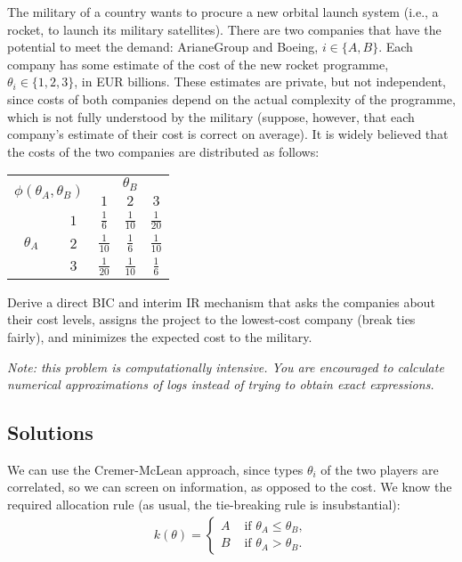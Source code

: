 \documentclass[a4paper]{article}
\newif\ifsolutions
\begin{document}
The military of a country wants to procure a new orbital launch system (i.e., a rocket, to launch its military satellites). There are two companies that have the potential to meet the demand: ArianeGroup and Boeing, $i \in \{A,B\}$. Each company has some estimate of the cost of the new rocket programme, $\theta_i \in \{1,2,3\}$, in EUR billions. These estimates are private, but not independent, since costs of both companies depend on the actual complexity of the programme, which is not fully understood by the military (suppose, however, that each company's estimate of their cost is correct on average). It is widely believed that the costs of the two companies are distributed as follows:
\begin{center}
	\begin{tabular}{c  c | c | c | c |}
		\multicolumn{2}{c}{\multirow{2}{*}{$\phi(\theta_A,\theta_B)$}} & \multicolumn{3}{c}{$\theta_B$} \\
		&& $1$ 				& $2$	& $3$				\\ \hline
		\multirow{3}{*}{$\theta_A$} &
		$1$	& $\frac{1}{6}$	& $\frac{1}{10}$	& $\frac{1}{20}$	\\ \hline
		&$2$	& $\frac{1}{10}$& $\frac{1}{6}$		& $\frac{1}{10}$	\\ \hline
		&$3$	& $\frac{1}{20}$& $\frac{1}{10}$	& $\frac{1}{6}$		\\ \hline
	\end{tabular}
\end{center}

Derive a direct BIC and interim IR mechanism that asks the companies about their cost levels, assigns the project to the lowest-cost company (break ties fairly), and minimizes the expected cost to the military.


\emph{Note: this problem is computationally intensive. You are encouraged to calculate numerical approximations of logs instead of trying to obtain exact expressions.}


\ifsolutions
\subsection*{Solutions}

We can use the Cremer-McLean approach, since types $\theta_i$ of the two players are correlated, so we can screen on information, as opposed to the cost.
We know the required allocation rule (as usual, the tie-breaking rule is insubstantial):
\begin{align*}
	k(\theta) = \begin{cases}
		A & \text{ if } \theta_A \leq \theta_B,
		\\
		B & \text{ if } \theta_A > \theta_B.
	\end{cases}
\end{align*}
\end{document}
